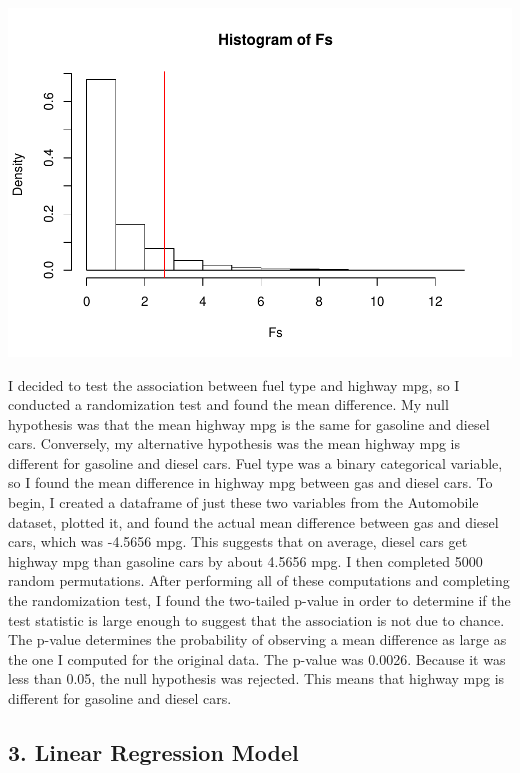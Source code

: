 \documentclass[]{article}
\begin{document}
\begin{center}\includegraphics{project2_files/figure-latex/unnamed-chunk-2-2} \end{center}

I decided to test the association between fuel type and highway mpg, so
I conducted a randomization test and found the mean difference. My null
hypothesis was that the mean highway mpg is the same for gasoline and
diesel cars. Conversely, my alternative hypothesis was the mean highway
mpg is different for gasoline and diesel cars. Fuel type was a binary
categorical variable, so I found the mean difference in highway mpg
between gas and diesel cars. To begin, I created a dataframe of just
these two variables from the Automobile dataset, plotted it, and found
the actual mean difference between gas and diesel cars, which was
-4.5656 mpg. This suggests that on average, diesel cars get highway mpg
than gasoline cars by about 4.5656 mpg. I then completed 5000 random
permutations. After performing all of these computations and completing
the randomization test, I found the two-tailed p-value in order to
determine if the test statistic is large enough to suggest that the
association is not due to chance. The p-value determines the probability
of observing a mean difference as large as the one I computed for the
original data. The p-value was 0.0026. Because it was less than 0.05,
the null hypothesis was rejected. This means that highway mpg is
different for gasoline and diesel cars.

\subsection{3. Linear Regression Model}\label{linear-regression-model}
\end{document}
